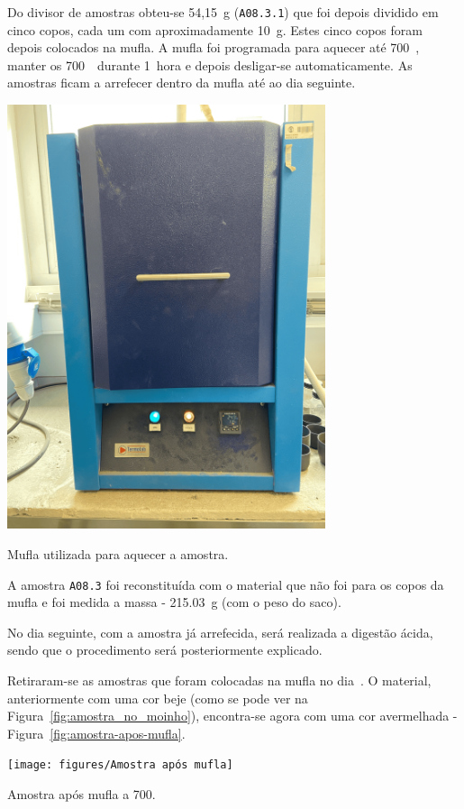 Do divisor de amostras obteu-se 54,15~g (\texttt{A08.3.1}) que foi depois dividido em cinco copos, cada um com aproximadamente 10~g.
Estes cinco copos foram depois colocados na mufla.
A mufla foi programada para aquecer até 700~\graus, manter os 700~\graus \, durante 1~hora e depois desligar-se automaticamente.
As amostras ficam a arrefecer dentro da mufla até ao dia seguinte.
\begin{marginfigure}
    \centering
    \includegraphics[width=0.7\textwidth]{figures/Mufla}
    \caption{Mufla utilizada para aquecer a amostra.}
    \label{fig:mufla}
\end{marginfigure}

A amostra \texttt{A08.3} foi reconstituída com o material que não foi para os copos da mufla e foi medida a massa - 215.03~g (com o peso do saco).

No dia seguinte, com a amostra já arrefecida, será realizada a digestão ácida, sendo que o procedimento será posteriormente explicado.

\hrulefill


\label{day:8-novembro-2024}

Retiraram-se as amostras que foram colocadas na mufla no dia~.
O material, anteriormente com uma cor beje (como se pode ver na Figura~\ref{fig:amostra_no_moinho}), encontra-se agora com uma cor avermelhada - Figura~\ref{fig:amostra-apos-mufla}.
\begin{marginfigure}
    \centering
    \texttt{[image: figures/Amostra após mufla]}
    \caption{Amostra após mufla a 700\graus.}
    \label{fig:amostra-apos-mufla}
\end{marginfigure}

